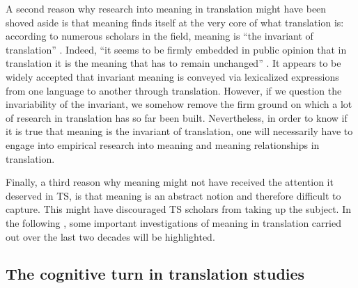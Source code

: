 A second reason why research into meaning in translation might have been shoved aside is that meaning finds itself at the very core of what translation is: according to numerous scholars in the field, meaning is “the invariant of translation” \citep[82]{lewandowska-tomasczyk_specification_2010}. Indeed, “it seems to be firmly embedded in public opinion that in translation it is the meaning that has to remain unchanged” \citep[82]{lewandowska-tomasczyk_specification_2010}. It appears to be widely accepted that invariant meaning is conveyed via lexicalized expressions from one language to another through translation. However, if we question the invariability of the invariant, we somehow remove the firm ground on which a lot of research in translation has so far been built. Nevertheless, in order to know if it is true that meaning is the invariant of translation, one will necessarily have to engage into empirical research into meaning and meaning relationships in translation.

Finally, a third reason why meaning might not have received the attention it deserved in TS, is that meaning is an abstract notion and therefore difficult to capture. This might have discouraged TS scholars from taking up the subject. In the following , some important investigations of meaning in translation carried out over the last two decades will be highlighted.

\subsection{The cognitive turn in translation studies}
\label{sec:2.2.3}  

